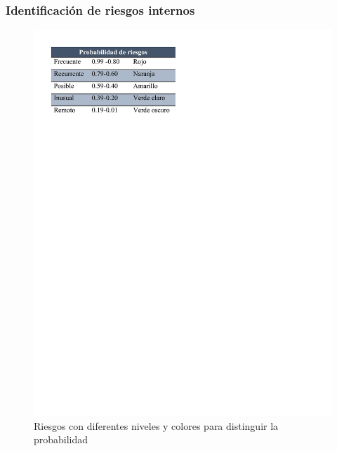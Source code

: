     \subsubsection{Identificación de riesgos internos}
    
    
    \begin{figure}[H] 
        \centering
        \includegraphics[trim = {10mm 215mm 100mm 10mm},clip,scale=0.7]{22/Img/riesgosPorProbabilidad.pdf}
        \caption{Riesgos con diferentes niveles y colores para distinguir la probabilidad}
        \label{fig:prob}
    \end{figure}
    
